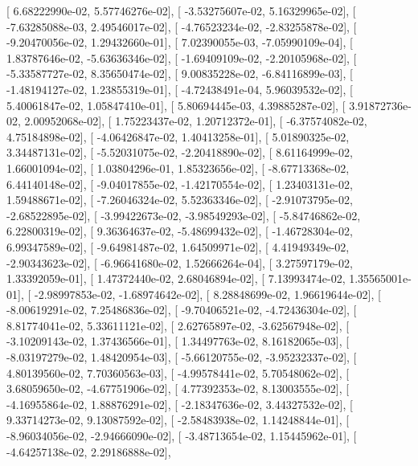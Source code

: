 \documentclass{article}
\begin{document}
       [  6.68222990e-02,   5.57746276e-02],
       [ -3.53275607e-02,   5.16329965e-02],
       [ -7.63285088e-03,   2.49546017e-02],
       [ -4.76523234e-02,  -2.83255878e-02],
       [ -9.20470056e-02,   1.29432660e-01],
       [  7.02390055e-03,  -7.05990109e-04],
       [  1.83787646e-02,  -5.63636346e-02],
       [ -1.69409109e-02,  -2.20105968e-02],
       [ -5.33587727e-02,   8.35650474e-02],
       [  9.00835228e-02,  -6.84116899e-03],
       [ -1.48194127e-02,   1.23855319e-01],
       [ -4.72438491e-04,   5.96039532e-02],
       [  5.40061847e-02,   1.05847410e-01],
       [  5.80694445e-03,   4.39885287e-02],
       [  3.91872736e-02,   2.00952068e-02],
       [  1.75223437e-02,   1.20712372e-01],
       [ -6.37574082e-02,   4.75184898e-02],
       [ -4.06426847e-02,   1.40413258e-01],
       [  5.01890325e-02,   3.34487131e-02],
       [ -5.52031075e-02,  -2.20418890e-02],
       [  8.61164999e-02,   1.66001094e-02],
       [  1.03804296e-01,   1.85323656e-02],
       [ -8.67713368e-02,   6.44140148e-02],
       [ -9.04017855e-02,  -1.42170554e-02],
       [  1.23403131e-02,   1.59488671e-02],
       [ -7.26046324e-02,   5.52363346e-02],
       [ -2.91073795e-02,  -2.68522895e-02],
       [ -3.99422673e-02,  -3.98549293e-02],
       [ -5.84746862e-02,   6.22800319e-02],
       [  9.36364637e-02,  -5.48699432e-02],
       [ -1.46728304e-02,   6.99347589e-02],
       [ -9.64981487e-02,   1.64509971e-02],
       [  4.41949349e-02,  -2.90343623e-02],
       [ -6.96641680e-02,   1.52666264e-04],
       [  3.27597179e-02,   1.33392059e-01],
       [  1.47372440e-02,   2.68046894e-02],
       [  7.13993474e-02,   1.35565001e-01],
       [ -2.98997853e-02,  -1.68974642e-02],
       [  8.28848699e-02,   1.96619644e-02],
       [ -8.00619291e-02,   7.25486836e-02],
       [ -9.70406521e-02,  -4.72436304e-02],
       [  8.81774041e-02,   5.33611121e-02],
       [  2.62765897e-02,  -3.62567948e-02],
       [ -3.10209143e-02,   1.37436566e-01],
       [  1.34497763e-02,   8.16182065e-03],
       [ -8.03197279e-02,   1.48420954e-03],
       [ -5.66120755e-02,  -3.95232337e-02],
       [  4.80139560e-02,   7.70360563e-03],
       [ -4.99578441e-02,   5.70548062e-02],
       [  3.68059650e-02,  -4.67751906e-02],
       [  4.77392353e-02,   8.13003555e-02],
       [ -4.16955864e-02,   1.88876291e-02],
       [ -2.18347636e-02,   3.44327532e-02],
       [  9.33714273e-02,   9.13087592e-02],
       [ -2.58483938e-02,   1.14248844e-01],
       [ -8.96034056e-02,  -2.94666090e-02],
       [ -3.48713654e-02,   1.15445962e-01],
       [ -4.64257138e-02,   2.29186888e-02],
\end{document}
